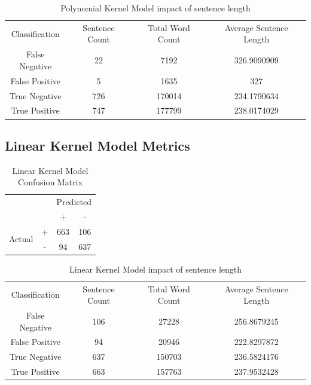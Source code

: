 \begin{table}[h!]
    \centering
    \begin{tabular}[h]{c|c|c|c}
        Classification & Sentence Count & Total Word Count & Average Sentence Length\\
        False Negative & 22 & 7192 & 326.9090909\\
        False Positive & 5 & 1635 & 327\\
        True Negative & 726 & 170014 & 234.1790634\\
        True Positive & 747 & 177799 & 238.0174029\\
    \end{tabular}
    \caption{\label{tab:poly_wc}Polynomial Kernel Model impact of sentence length}
\end{table}

\subsection{Linear Kernel Model Metrics}
\begin{table}[h!]
    \centering
    \begin{tabular}[h]{c c|c|c|}
        \cline{3-4}
        & & \multicolumn{2}{c|}{Predicted} \\
        \cline{3-4}
        & & + & - \\
        \hline
        \multicolumn{1}{|c|}{\multirow{2}{3em}{Actual}} & + & 663 & 106 \\
        \cline{2-4}
        \multicolumn{1}{|c|}{} & - & 94 & 637 \\
        \hline
    \end{tabular}
    \caption{\label{tab:lin_confusion}Linear Kernel Model Confusion Matrix}
\end{table}

\begin{table}[h!]
    \centering
    \begin{tabular}[h]{c|c|c|c}
        Classification & Sentence Count & Total Word Count & Average Sentence Length\\
        False Negative & 106 & 27228 & 256.8679245\\
        False Positive & 94 & 20946 & 222.8297872\\
        True Negative & 637 & 150703 & 236.5824176\\
        True Positive & 663 & 157763 & 237.9532428\\
    \end{tabular}
    \caption{\label{tab:lin_wc}Linear Kernel Model impact of sentence length}
\end{table}
